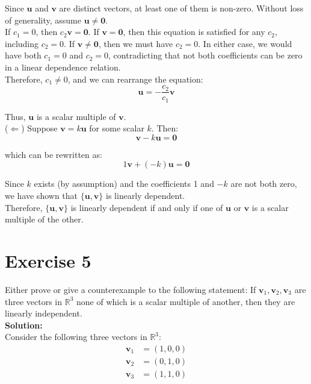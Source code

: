 \documentclass{article}
\begin{document}
Since $\mathbf{u}$ and $\mathbf{v}$ are distinct vectors, at least one of them is non-zero. Without loss of generality, assume $\mathbf{u} \neq \mathbf{0}$. \\

If $c_1 = 0$, then $c_2\mathbf{v} = \mathbf{0}$. If $\mathbf{v} = \mathbf{0}$, then this equation is satisfied for any $c_2$, including $c_2 = 0$. If $\mathbf{v} \neq \mathbf{0}$, then we must have $c_2 = 0$. In either case, we would have both $c_1 = 0$ and $c_2 = 0$, contradicting that not both coefficients can be zero in a linear dependence relation. \\

Therefore, $c_1 \neq 0$, and we can rearrange the equation:
\[\mathbf{u} = -\frac{c_2}{c_1}\mathbf{v}\]

Thus, $\mathbf{u}$ is a scalar multiple of $\mathbf{v}$. \\

($\Leftarrow$) Suppose $\mathbf{v} = k\mathbf{u}$ for some scalar $k$. Then:
\[\mathbf{v} - k\mathbf{u} = \mathbf{0}\]

which can be rewritten as:
\[1\mathbf{v} + (-k)\mathbf{u} = \mathbf{0}\]

Since $k$ exists (by assumption) and the coefficients 1 and $-k$ are not both zero, we have shown that $\{\mathbf{u}, \mathbf{v}\}$ is linearly dependent. \\

Therefore, $\{\mathbf{u}, \mathbf{v}\}$ is linearly dependent if and only if one of $\mathbf{u}$ or $\mathbf{v}$ is a scalar multiple of the other.

\newpage

\section*{Exercise 5}
Either prove or give a counterexample to the following statement: If $\mathbf{v}_1, \mathbf{v}_2, \mathbf{v}_3$ are three vectors in $\mathbb{R}^3$ none of which is a scalar multiple of another, then they are linearly independent. \\

\textbf{Solution:} \\

Consider the following three vectors in $\mathbb{R}^3$:
\begin{align*}
\mathbf{v}_1 &= (1,0,0) \\
\mathbf{v}_2 &= (0,1,0) \\
\mathbf{v}_3 &= (1,1,0)
\end{align*}
\end{document}
